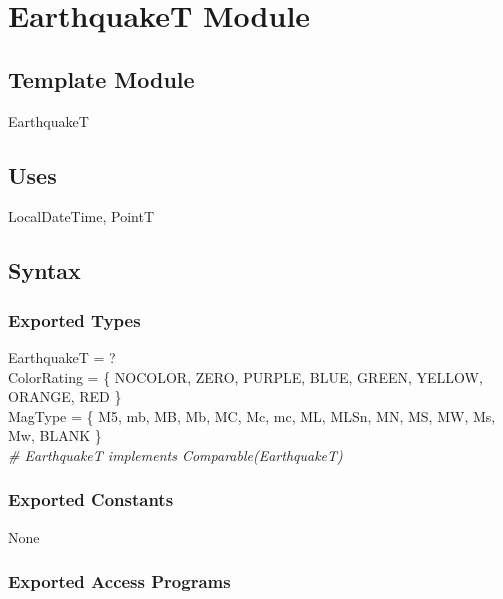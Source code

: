 \documentclass[12pt]{article}
\begin{document}
\newpage

\section* {EarthquakeT Module}

\subsection* {Template Module}

EarthquakeT

\subsection* {Uses}

LocalDateTime, PointT

\subsection* {Syntax}

\subsubsection* {Exported Types}

EarthquakeT = ?\\

\noindent ColorRating = \{ NOCOLOR, ZERO, PURPLE, BLUE, GREEN, YELLOW, ORANGE, RED \}\\

\noindent MagType = \{ M5, mb, MB, Mb, MC, Mc, mc, ML, MLSn, MN, MS, MW, Ms, Mw, BLANK \}\\

\noindent \textit{\# EarthquakeT implements Comparable(EarthquakeT)}

\subsubsection* {Exported Constants}

None

\subsubsection* {Exported Access Programs}
\end{document}
